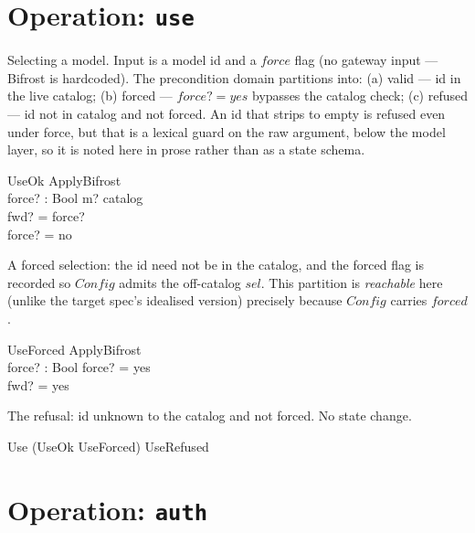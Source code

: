 \documentclass{article}
\begin{document}
\section{Operation: \texttt{use}}

Selecting a model. Input is a model id and a $force$ flag (no gateway input ---
Bifrost is hardcoded). The precondition domain partitions into: (a) valid --- id
in the live catalog; (b) forced --- $force? = yes$ bypasses the catalog check;
(c) refused --- id not in catalog and not forced. An id that strips to empty is
refused even under force, but that is a lexical guard on the raw argument, below
the model layer, so it is noted here in prose rather than as a state schema.

\begin{schema}{UseOk}
  ApplyBifrost \\
  force? : Bool
\where
  m? \in catalog \\
  fwd? = force? \\
  force? = no
\end{schema}

A forced selection: the id need not be in the catalog, and the forced flag is
recorded so $Config$ admits the off-catalog $sel$. This partition is
\emph{reachable} here (unlike the target spec's idealised version) precisely
because $Config$ carries $forced$.

\begin{schema}{UseForced}
  ApplyBifrost \\
  force? : Bool
\where
  force? = yes \\
  fwd? = yes
\end{schema}

The refusal: id unknown to the catalog and not forced. No state change.


\begin{zed}
  Use  (UseOk \lor UseForced) \lor UseRefused
\end{zed}

\section{Operation: \texttt{auth}}
\end{document}
